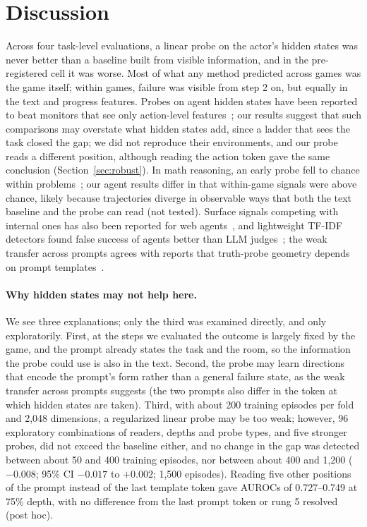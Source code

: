 \documentclass[10pt]{article}
\begin{document}
\section{Discussion}
Across four task-level evaluations, a linear probe on the actor's hidden states was never better than a baseline built from visible information, and in the pre-registered cell it was worse.
Most of what any method predicted across games was the game itself; within games, failure was visible from step 2 on, but equally in the text and progress features.
Probes on agent hidden states have been reported to beat monitors that see only action-level features~\cite{ruan2026doomed}; our results suggest that such comparisons may overstate what hidden states add, since a ladder that sees the task closed the gap; we did not reproduce their environments, and our probe reads a different position, although reading the action token gave the same conclusion (Section~\ref{sec:robust}).
In math reasoning, an early probe fell to chance within problems~\cite{bulut2026problem}; our agent results differ in that within-game signals were above chance, likely because trajectories diverge in observable ways that both the text baseline and the probe can read (not tested).
Surface signals competing with internal ones has also been reported for web agents~\cite{pan2026monitoring}, and lightweight TF-IDF detectors found false success of agents better than LLM judges~\cite{advani2026false}; the weak transfer across prompts agrees with reports that truth-probe geometry depends on prompt templates~\cite{poulis2026truth}.

\paragraph{Why hidden states may not help here.} We see three explanations; only the third was examined directly, and only exploratorily. First, at the steps we evaluated the outcome is largely fixed by the game, and the prompt already states the task and the room, so the information the probe could use is also in the text.
Second, the probe may learn directions that encode the prompt's form rather than a general failure state, as the weak transfer across prompts suggests (the two prompts also differ in the token at which hidden states are taken).
Third, with about 200 training episodes per fold and 2,048 dimensions, a regularized linear probe may be too weak; however, 96 exploratory combinations of readers, depths and probe types, and five stronger probes, did not exceed the baseline either, and no change in the gap was detected between about 50 and 400 training episodes, nor between about 400 and 1,200 ($-0.008$; 95\% CI $-0.017$ to $+0.002$; 1,500 episodes). Reading five other positions of the prompt instead of the last template token gave AUROCs of 0.727--0.749 at 75\% depth, with no difference from the last prompt token or rung 5 resolved (post hoc).
\end{document}
